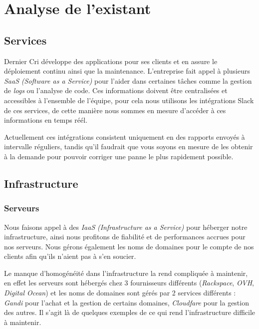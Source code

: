\documentclass[12pt,a4paper]{article}
\begin{document}
  \newpage

  \section{Analyse de l'existant}\label{analyse-de-lexistant}

  \subsection{Services}\label{services}

  Dernier Cri développe des applications pour ses clients et en assure le
  déploiement continu ainsi que la maintenance. L'entreprise fait appel à
  plusieurs \emph{SaaS} \emph{(Software as a Service)} pour l'aider dans
  certaines tâches comme la gestion de \emph{logs} ou l'analyse de code.
  Ces informations doivent être centralisées et accessibles à l'ensemble
  de l'équipe, pour cela nous utilisons les intégrations Slack de ces
  services, de cette manière nous sommes en mesure d'accéder à ces
  informations en temps réél.

  \bigskip

  Actuellement ces intégrations consistent uniquement en des rapports
  envoyés à intervalle réguliers, tandis qu'il faudrait que vous soyons en
  mesure de les obtenir à la demande pour pouvoir corriger une panne le
  plus rapidement possible.

  \newpage

  \subsection{Infrastructure}\label{infrastructure}

  \subsubsection{Serveurs}\label{serveurs}

  Nous faisons appel à des \emph{IaaS} \emph{(Infrastructure as a
  Service)} pour héberger notre infrastructure, ainsi nous profitons de
  fiabilité et de performances accrues pour nos serveurs. Nous gérons
  également les noms de domaines pour le compte de nos clients afin qu'ils
  n'aient pas à s'en soucier.

  \bigskip

  Le manque d'homogénéité dans l'infrastructure la rend compliquée à
  maintenir, en effet les serveurs sont hébergés chez 3 fournisseurs
  différents (\emph{Rackspace}, \emph{OVH}, \emph{Digital Ocean}) et les
  noms de domaines sont gérés par 2 services différents : \emph{Gandi}
  pour l'achat et la gestion de certains domaines, \emph{Cloudfare} pour
  la gestion des autres. Il s'agit là de quelques exemples de ce qui rend
  l'infrastructure difficile à maintenir.
\end{document}

